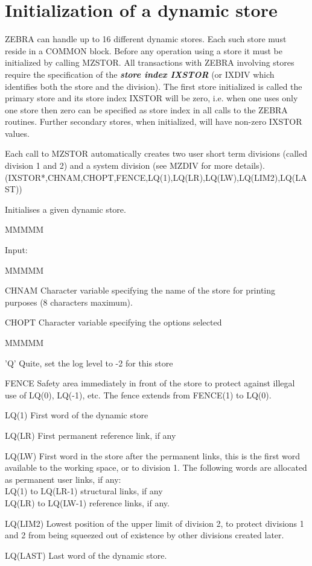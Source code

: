 \section{Initialization of a dynamic store}
\par
ZEBRA can handle up to 16 different dynamic stores. Each such store
must reside in a COMMON block.
Before any operation using a store
it must be initialized by calling MZSTOR.
All transactions with ZEBRA involving stores require the specification
of the
{\bf\it store index IXSTOR}
(or IXDIV which identifies both the store and the division).
The first store initialized is called the primary store and
its store index IXSTOR will be zero, i.e.
when one uses only one store then zero can be specified
as store index in all calls to the ZEBRA routines.
Further secondary stores, when initialized, will have
non-zero IXSTOR values.
\par Each call to MZSTOR automatically creates two user short term
divisions (called division 1 and 2) and a system division (see MZDIV
for more details).
(IXSTOR*,CHNAM,CHOPT,FENCE,LQ(1),LQ(LR),LQ(LW),LQ(LIM2),LQ(LAST))
\par Initialises a given dynamic store.
\begin{DL}{MMMMM}
\item[Input:]
\begin{DL}{MMMMM}
\item[CHNAM]Character variable specifying the name of the store for
printing purposes (8 characters maximum).
\item[CHOPT]Character variable specifying the options selected
\begin{DL}{MMMMM}
\item['Q']Quite, set the log level to -2 for this store
\end{DL}
\item[FENCE]Safety area immediately in front of the store to
protect against illegal use of LQ(0), LQ(-1), etc.
The fence extends from FENCE(1) to LQ(0).
\item[LQ(1)]First word of the dynamic store
\item[LQ(LR)]First permanent reference link, if any
\item[LQ(LW)]First word in the store after the permanent links,
this is the first word available to the working
space, or to division 1. The following words are
allocated as permanent user links, if any:\\
LQ(1)  to LQ(LR-1)  structural links, if any\\
LQ(LR) to LQ(LW-1)  reference links, if any.
\item[LQ(LIM2)]Lowest position of the upper limit of division 2,
to protect divisions 1 and 2 from being squeezed out
of existence by other divisions created later.
\item[LQ(LAST)
]Last word of the dynamic store.
\end{DL}
\end{DL}
